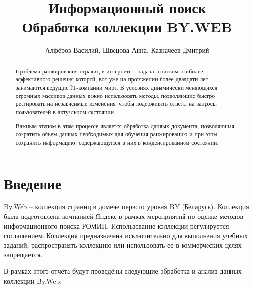 \documentclass[twocolumn]{article}
\title{Информационный поиск\\ Обработка коллекции BY.WEB}
\author{Алфёров Василий, Швецова Анна, Казначеев Дмитрий}
\begin{document}
\maketitle        

\begin{abstract}
	Проблема ранжирования страниц в интернете -- задача, поиском наиболее эффективного решения которой, вот уже на протяжении более двадцати лет занимаются ведущие IT-компании мира. В условиях динамически меняющихся огромных массивов данных важно использовать методы, позволяющие быстро реагировать на независимые изменения, чтобы подерживать ответы на запросы пользователей в актуальном состоянии. 
	
	Важным этапом в этом процессе является обработка данных документа, позволяющая сократить объем данных необходимых для обучения ранжированию и при этом сохранить информацию, содержающуюся в них в конденсированном состоянии. 
\end{abstract}

\section{Введение}

By.Web -- коллекция страниц в домене первого уровня BY (Беларусь). Коллекция была подготовлена компанией Яндекс в рамках мероприятий по оценке методов информационного поиска РОМИП. Использование коллекции регулируется соглашением. Коллекция предназначена исключительно для выполнения учебных заданий, распространять коллекцию или использовать ее в коммерческих целях запрещается.	

В рамках этого отчёта будут проведёны следующие обработка и анализ данных коллекции By.Web:
\end{document}

